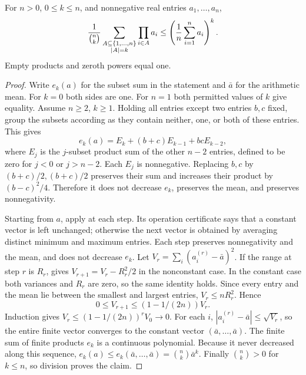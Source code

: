 \begin{lemma}
For $n>0$, $0\le k\le n$, and nonnegative real entries $a_1,\ldots,a_n$,
\[
 {1\over\binom n k}\sum_{\substack{A\subseteq\{1,\ldots,n\}\\|A|=k}}
       \prod_{i\in A}a_i
 \le\left({1\over n}\sum_{i=1}^n a_i\right)^k.
\]
Empty products and zeroth powers equal one.
\end{lemma}
\begin{proof}
Write $e_k(a)$ for the subset sum in the statement and $\bar a$ for the
arithmetic mean. For $k=0$ both sides are one. For $n=1$ both permitted
values of $k$ give equality. Assume $n\ge2$, $k\ge1$.
Holding all entries except two entries $b,c$ fixed, group the subsets
according as they contain neither, one, or both of these entries. This
gives
\[
 e_k(a)=E_k+(b+c)E_{k-1}+bcE_{k-2},
\]
where $E_j$ is the $j$-subset product sum of the other $n-2$ entries,
defined to be zero for $j<0$ or $j>n-2$. Each $E_j$ is nonnegative.
Replacing $b,c$ by $(b+c)/2,(b+c)/2$ preserves their sum and increases
their product by $(b-c)^2/4$. Therefore it does not decrease $e_k$,
preserves the mean, and preserves nonnegativity.

Starting from $a$, apply 
at each step. Its operation certificate says that a constant vector
is left unchanged; otherwise the next vector is obtained by averaging
distinct minimum and maximum entries. Each step preserves
nonnegativity and the mean, and does not decrease $e_k$. Let
$V_r=\sum_i(a_i^{(r)}-\bar a)^2$. If the range at step $r$ is $R_r$,
 gives
$V_{r+1}=V_r-R_r^2/2$ in the nonconstant case. In the constant case
both variances and $R_r$ are zero, so the same identity holds.
Since every entry and the mean lie between the
smallest and largest entries, $V_r\le nR_r^2$. Hence
\[
 0\le V_{r+1}\le(1-1/(2n))V_r.
\]
Induction gives $V_r\le(1-1/(2n))^rV_0\to0$.
For each $i$, $|a_i^{(r)}-\bar a|\le\sqrt{V_r}$, so the entire finite
vector converges to the constant vector $(\bar a,\ldots,\bar a)$.
The finite sum of finite products $e_k$ is a continuous polynomial.
Because it never decreased along this sequence,
$e_k(a)\le e_k(\bar a,\ldots,\bar a)=\binom n k\bar a^k$.
Finally $\binom n k>0$ for $k\le n$, so division proves the claim.
\end{proof}
